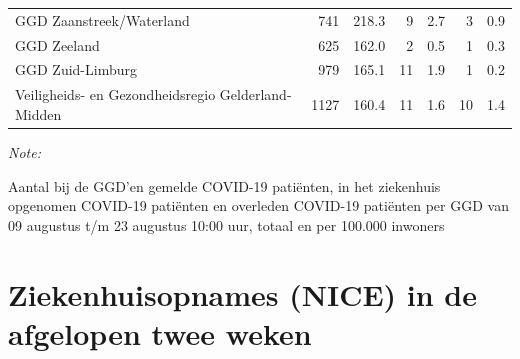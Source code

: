 \documentclass[
  english,
  man,floatsintext]{apa6}
\begin{document}
\begin{table}
\begin{threeparttable}
\begin{tabular}{lrrrrrr}
GGD Zaanstreek/Waterland & 741 & 218.3 & 9 & 2.7 & 3 & 0.9\\
GGD Zeeland & 625 & 162.0 & 2 & 0.5 & 1 & 0.3\\
GGD Zuid-Limburg & 979 & 165.1 & 11 & 1.9 & 1 & 0.2\\
Veiligheids- en Gezondheidsregio Gelderland-Midden & 1127 & 160.4 & 11 & 1.6 & 10 & 1.4\\
\bottomrule
\end{tabular}
\begin{tablenotes}
\item \textit{Note: } 
\item Aantal bij de GGD’en gemelde COVID-19 patiënten, in het ziekenhuis opgenomen COVID-19 patiënten en overleden COVID-19 patiënten per GGD van 09 augustus t/m 23 augustus 10:00 uur, totaal en per 100.000 inwoners
\end{tablenotes}
\end{threeparttable}
\endgroup{}
\end{table}

\newpage

\hypertarget{ziekenhuisopnames-nice-in-de-afgelopen-twee-weken}{%
\section{Ziekenhuisopnames (NICE) in de afgelopen twee weken}\label{ziekenhuisopnames-nice-in-de-afgelopen-twee-weken}}
\end{document}
